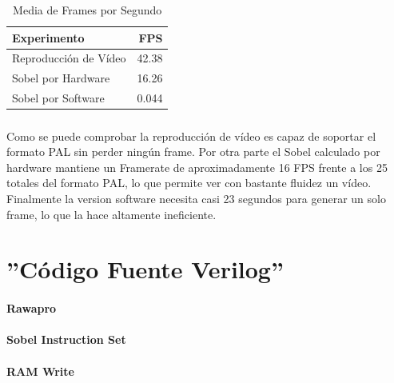 \documentclass[a4paper,12pt,titlepage,final]{book}
\begin{document}
\begin{table}[hbtp]
\centering
\begin{tabular}{l r}
Experimento            & FPS \\
\hline
Reproducción de Vídeo  & 42.38 \\
Sobel por Hardware     & 16.26 \\
Sobel por Software     & 0.044 \\
\end{tabular}
\caption{Media de Frames por Segundo}
\label{tab:resutadosf}
\end{table}

\paragraph{}
Como se puede comprobar la reproducción de vídeo es capaz de soportar el formato PAL sin perder ningún frame. Por otra parte el Sobel calculado por hardware mantiene un Framerate de aproximadamente 16 FPS frente a los 25 totales del formato PAL, lo que permite ver con bastante fluidez un vídeo. Finalmente la version software necesita casi 23 segundos para generar un solo frame, lo que la hace altamente ineficiente.

\appendix
\cleardoublepage %
\pagestyle{empty}
\appendixpage
\noappendicestocpagenum
\addappheadtotoc

\chapter{''Código Fuente Verilog''}

\subsubsection{Rawapro}
\raggedbottom

\flushbottom
\clearpage

\subsubsection{Sobel Instruction Set}
\raggedbottom

\flushbottom
\clearpage

\subsubsection{RAM Write}
\raggedbottom

\flushbottom
\clearpage
\end{document}
